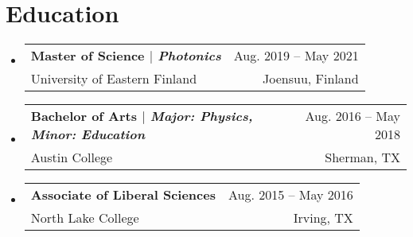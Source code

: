 \documentclass[A4,11pt]{article}
\makeatletter
\newcommand{\CVSubheading}[4]{
  \vspace{-2pt}\item
    \begin{tabular*}{0.97\textwidth}[t]{l@{\extracolsep{\fill}}r}
      \textbf{#1} & #2 \\
      \small#3 & \small #4 \\
    \end{tabular*}\vspace{-7pt}
}
\newcommand{\CVSubHeadingListStart}{\begin{itemize}[leftmargin=0.5cm, label={}]}
\newcommand{\CVSubHeadingListEnd}{\end{itemize}}
\makeatother
\begin{document}
\begin{comment}
This CV was written for specifically for positions I was applying for in
academia, and then modified to be a template.

A standard CV is about two pages long where as a resume in the US is one page.
sections can be added and removed here with this in mind. In my experience, 
education, and applicable work experience and skills are the most import things
to include on a resume. For a CV the Europass CV suggests the categories: Work
Experience, Education and Training, Language Skills, Digital Skills,
Communication and Interpersonal Skills, Conferences and Seminars, Creative Works
Driver's License, Hobbies and Interests, Honors and Awards, Management and
Leadership Skills, Networks and Memberships, Organizational Skills, Projects,
Publications, Recommendations, Social and Political Activities, Volunteering.

Your goal is to convey a who, what , when, where, why for every item you share. 
The who is obviously you, but I believe the rest should be done in that order.
For example below. An employer cares most about the degree held and typically 
less about the institution or where it is located (This is still good 
information though). Whatever order you choose be consistent throughout.
\end{comment}

\section{Education}
  \CVSubHeadingListStart
    \CVSubheading
      {{Master of Science $|$ \emph{\small{Photonics}}}}{Aug. 2019 -- May 2021}
      {University of Eastern Finland}{Joensuu, Finland}
    \CVSubheading
      {{Bachelor of Arts $|$ \emph{\small{Major: Physics, Minor: Education}}}}{Aug. 2016 -- May 2018}
      {Austin College}{Sherman, TX}
    \CVSubheading
      {Associate of Liberal Sciences}{Aug. 2015 -- May 2016}
      {North Lake College}{Irving, TX}
  \CVSubHeadingListEnd

\begin{comment}
try to briefly explain what you did and why it is relevant to the position you
are seeking
\end{comment}
\end{document}

